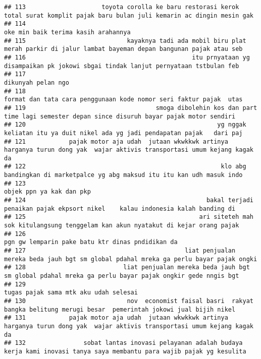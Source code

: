 \documentclass[
]{article}
\begin{document}
\begin{verbatim}
## 113                     toyota corolla ke baru restorasi kerok total surat komplit pajak baru bulan juli kemarin ac dingin mesin gak
## 114                                                                                              oke min baik terima kasih arahannya
## 115                            kayaknya tadi ada mobil biru plat merah parkir di jalur lambat bayeman depan bangunan pajak atau seb 
## 116                                              itu prnyataan yg disampaikan pk jokowi sbgai tindak lanjut pernyataan tstbulan feb 
## 117                                                                                                         dikunyah pelan ngo      
## 118                                                              format dan tata cara penggunaan kode nomor seri faktur pajak  utas 
## 119                                    smoga dibolehin kos dan part time lagi semester depan since disuruh bayar pajak motor sendiri
## 120                                                     yg nggak keliatan itu ya duit nikel ada yg jadi pendapatan pajak   dari paj 
## 121            pajak motor aja udah  jutaan wkwkkwk artinya harganya turun dong yak  wajar aktivis transportasi umum kejang kagak da
## 122                                                      klo abg bandingkan di marketpalce yg abg maksud itu itu kan udh masuk indo 
## 123                                                                                                         objek ppn ya kak dan pkp
## 124                                                  bakal terjadi penaikan pajak ekpsort nikel    kalau indonesia kalah banding di 
## 125                                                ari siteteh mah sok kitulangsung tenggelam kan akun nyatakut di kejar orang pajak
## 126                                                                                pgn gw lemparin pake batu ktr dinas pndidikan da 
## 127                                            liat penjualan mereka beda jauh bgt sm global pdahal mreka ga perlu bayar pajak ongki
## 128                           liat penjualan mereka beda jauh bgt sm global pdahal mreka ga perlu bayar pajak ongkir gede nngis bgt 
## 129                                                                                           tugas pajak sama mtk aku udah selesai 
## 130                            nov  economist faisal basri  rakyat bangka belitung merugi besar  pemerintah jokowi jual bijih nikel 
## 131            pajak motor aja udah  jutaan wkwkkwk artinya harganya turun dong yak  wajar aktivis transportasi umum kejang kagak da
## 132                sobat lantas inovasi pelayanan adalah budaya kerja kami inovasi tanya saya membantu para wajib pajak yg kesulita 

\end{verbatim}
\end{document}
